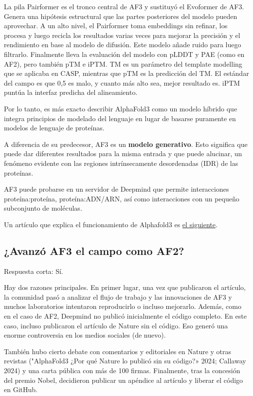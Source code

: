 La pila Pairformer es el tronco central de AF3 y sustituyó el Evoformer de AF3. Genera una hipótesis estructural que las partes posteriores del modelo pueden aprovechar. A un alto nivel, el Pairformer toma embeddings sin refinar, los procesa y luego recicla los resultados varias veces para mejorar la precisión y el rendimiento en base al modelo de difusión. Este modelo añade ruido para luego filtrarlo. Finalmente lleva la evaluación del modelo con pLDDT y PAE (como en AF2), pero también pTM e iPTM. TM es un parámetro del template modelling que se aplicaba en CASP, mientras que pTM es la predicción del TM. El estándar del campo es que 0,5 es malo, y cuanto más alto sea, mejor resultado es. iPTM puntúa la interfaz predicha del alineamiento.

Por lo tanto, es más exacto describir AlphaFold3 como un modelo híbrido que integra principios de modelado del lenguaje en lugar de basarse puramente en modelos de lenguaje de proteínas.

A diferencia de su predecesor, AF3 es un \textbf{modelo generativo}. Esto significa que puede dar diferentes resultados para la misma entrada y que puede alucinar, un fenómeno evidente con las regiones intrínsecamente desordenadas (IDR) de las proteínas.

AF3 puede probarse en un servidor de Deepmind que permite interacciones proteína:proteína, proteína:ADN/ARN, así como interacciones con un pequeño subconjunto de moléculas.

Un artículo que explica el funcionamiento de Alphafold3 es \href{https://research.dimensioncap.com/p/an-opinionated-alphafold3-field-guide}{el siguiente}.

\subsection{¿Avanzó AF3 el campo como AF2?}
Respuesta corta: Sí.

Hay dos razones principales. En primer lugar, una vez que publicaron el artículo, la comunidad pasó a analizar el flujo de trabajo y las innovaciones de AF3 y muchos laboratorios intentaron reproducirlo o incluso mejorarlo. Además, como en el caso de AF2, Deepmind no publicó inicialmente el código completo. En este caso, incluso publicaron el artículo de Nature sin el código. Eso generó una enorme controversia en los medios sociales (de nuevo).

También hubo cierto debate con comentarios y editoriales en Nature y otras revistas ("AlphaFold3 ¿Por qué Nature lo publicó sin su código?» 2024; Callaway 2024) y una carta pública con más de 100 firmas. Finalmente, tras la concesión del premio Nobel, decidieron publicar un apéndice al artículo y liberar el código en GitHub.

